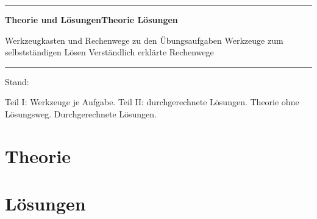 \documentclass[11pt,a4paper]{article}
\begin{document}
\hypersetup{pageanchor=false}
\begin{titlepage}
  \centering
  \vspace*{3cm}
  {\color{phblau}\rule{\linewidth}{1.2pt}}\par\vspace{1.2em}
  {\Huge\bfseries\color{phblau}%
   \ifzeigetheorie\ifzeigeloesungen Theorie und Lösungen\else Theorie\fi
   \else Lösungen\fi\par}
  \vspace{0.6em}
  {\large\color{phgrau}%
   \ifzeigetheorie\ifzeigeloesungen
     Werkzeugkasten und Rechenwege zu den Übungsaufgaben
   \else Werkzeuge zum selbstständigen Lösen\fi
   \else Verständlich erklärte Rechenwege\fi\par}
  \vspace{1.2em}
  {\color{phblau}\rule{\linewidth}{1.2pt}}\par
  \vfill
  {\large \SkriptStand\par}
  \vspace{0.4em}
  {\small\color{phgrau} Stand: \StandDatum\par}
  \vspace{0.4em}
  {\small\color{phgrau}%
   \ifzeigetheorie\ifzeigeloesungen
     Teil I: Werkzeuge je Aufgabe. Teil II: durchgerechnete Lösungen.
   \else Theorie ohne Lösungsweg.\fi
   \else Durchgerechnete Lösungen.\fi\par}
  \vfill
  {\small\color{phgrau} \Fachtitel\par}
\end{titlepage}
\hypersetup{pageanchor=true}

\tableofcontents
\clearpage

\ifzeigetheorie
  \part{Theorie}
  
\fi

\ifzeigeloesungen
  \clearpage
  \part{Lösungen}
  
\fi
\end{document}
